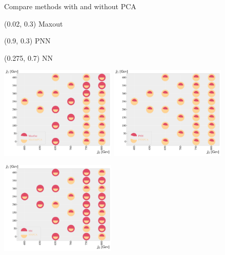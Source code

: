 \documentclass[UKenglish]{beamer}
\begin{document}
\begin{frame}{Compare methods with and without PCA}
    \begin{textblock}{0.8}(0.02, 0.3)
        {Maxout}
    \end{textblock}
    \begin{textblock}{0.8}(0.9, 0.3)
        {PNN}
    \end{textblock}
    \begin{textblock}{0.8}(0.275, 0.7)
    {NN}
    \end{textblock}
    \begin{center}
        \includegraphics[width=0.415\textwidth]{figures/Comps/MaxOutPCANetworkComp.pdf}
        \includegraphics[width=0.415\textwidth]{figures/Comps/PNNPCANetworkComp.pdf}
    \end{center}
    \centering
    \vspace{-0.2cm}
    \includegraphics[width=0.415\textwidth]{figures/Comps/NNPCANetworkComp.pdf}

\end{frame}
\end{document}
